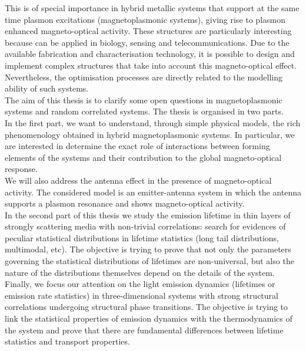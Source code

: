 This is of special importance in hybrid metallic systems that support at the same time plasmon excitations (magnetoplasmonic systems), giving rise to plasmon enhanced magneto-optical activity. 
These structures are particularly interesting because can be applied in biology, sensing and telecommunications. Due to the available fabrication and characterisation technology, it is possible to design and implement complex structures that take into account this magneto-optical effect. Nevertheless, the optimisation processes are directly related to the modelling ability of such systems.\\
The aim of this thesis is to clarify some open questions in magnetoplasmonic systems and random correlated systems. The thesis is organised in two parts.\\
In the first part, we want to understand, through simple physical models, the rich phenomenology obtained in hybrid magnetoplasmonic systems. In particular, we are interested in determine the exact role of interactions between forming elements of the systems and their contribution to the global magneto-optical response.\\
We will also address the antenna effect in the presence of magneto-optical activity. The considered model is an emitter-antenna system in which the antenna supports a plasmon resonance and shows magneto-optical activity.\\
In the second part of this thesis we study the emission lifetime in thin layers of strongly scattering media with non-trivial correlations: search for evidences of peculiar statistical distributions in lifetime statistics (long tail distributions, multimodal, etc). The objective is trying to prove that not only the parameters governing the statistical distributions of lifetimes are non-universal, but also the nature of the distributions themselves depend on the details of the system. \\
Finally, we focus our attention on the light emission dynamics (lifetimes or emission rate statistics) in three-dimensional systems with strong structural correlations undergoing structural phase transitions. The objective is trying to link the statistical properties of emission dynamics with the thermodynamics of the system and prove that there are fundamental differences between lifetime statistics and transport properties.\\





